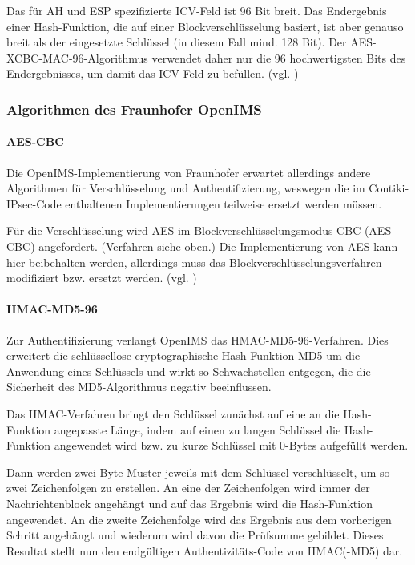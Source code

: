 Das für AH und ESP spezifizierte ICV-Feld ist 96 Bit breit. Das Endergebnis einer Hash-Funktion, die auf einer Blockverschlüsselung basiert, ist aber genauso breit als der eingesetzte Schlüssel (in diesem Fall mind. 128 Bit). Der AES-XCBC-MAC-96-Algorithmus verwendet daher nur die 96 hochwertigsten Bits des Endergebnisses, um damit das ICV-Feld zu befüllen. (vgl. \cite{RFC3566})

\subsubsection{Algorithmen des Fraunhofer OpenIMS}

\paragraph{AES-CBC}
Die OpenIMS-Im\-ple\-men\-tie\-rung von Fraunhofer erwartet allerdings andere Algorithmen für Verschlüsselung und Authentifizierung, weswegen die im Con\-ti\-ki-IPsec-Code enthaltenen Implementierungen teilweise ersetzt werden müssen.

Für die Verschlüsselung wird AES im Blockverschlüsselungsmodus CBC (AES-CBC) angefordert. (Verfahren siehe oben.) Die Implementierung von AES kann hier beibehalten werden, allerdings muss das Block\-ver\-schlüs\-se\-lungs\-ver\-fah\-ren modifiziert bzw. ersetzt werden. (vgl. \cite{RFC3602})

\paragraph{HMAC-MD5-96}
Zur Authentifizierung verlangt OpenIMS das HMAC-MD5-96-Verfahren. Dies erweitert die schlüssellose cryptographische Hash-Funktion MD5 um die Anwendung eines Schlüssels und wirkt so Schwachstellen entgegen, die die Sicherheit des MD5-Algorithmus negativ beeinflussen.

Das HMAC-Verfahren bringt den Schlüssel zunächst auf eine an die Hash-Funktion angepasste Länge, indem auf einen zu langen Schlüssel die Hash-Funktion angewendet wird bzw. zu kurze Schlüssel mit 0-Bytes aufgefüllt werden.

Dann werden zwei Byte-Muster jeweils mit dem Schlüssel verschlüsselt, um so zwei Zeichenfolgen zu erstellen. An eine der Zeichenfolgen wird immer der Nachrichtenblock angehängt und auf das Ergebnis wird die Hash-Funktion angewendet. An die zweite Zeichenfolge wird das Ergebnis aus dem vorherigen Schritt angehängt und wiederum wird davon die Prüfsumme gebildet. Dieses Resultat stellt nun den endgültigen Authentizitäts-Code von HMAC(-MD5) dar. 

